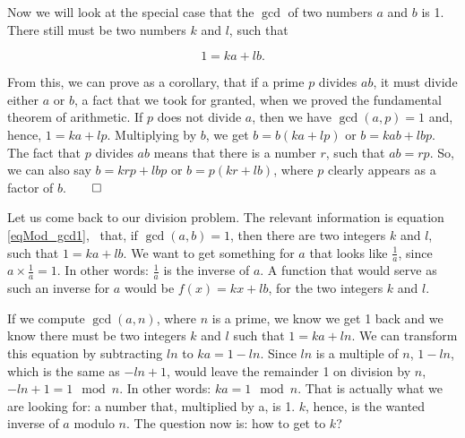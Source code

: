 \documentclass{scrreprt}
\begin{document}
Now we will look at the special case that the $\gcd$ 
of two numbers $a$ and $b$ is 1.
There still must be two numbers $k$ and $l$,
such that

\begin{equation}\label{eqMod_gcd1}
1 = ka + lb.
\end{equation}

From this, we can prove as a corollary,
that if a prime $p$ divides $ab$,
it must divide either $a$ or $b$,
a fact that we took for granted, when we proved
the fundamental theorem of arithmetic.
If $p$ does not divide $a$,
then we have $\gcd(a,p) = 1$ and, hence,
$1 = ka + lp$. 
Multiplying by $b$, we get $b = b(ka + lp)$ or
$b = kab + lbp$.
The fact that $p$ divides $ab$ means
that there is a number $r$, such that
$ab = rp$. So, we can also say $b = krp + lbp$ or
$b = p (kr + lb)$, where $p$ clearly appears as
a factor of $b$.$\qed$


Let us come back to our division problem.
The relevant information
is equation \ref{eqMod_gcd1}, \ie\ that,
if $\gcd(a,b) = 1$, then there are two integers
$k$ and $l$, such that $1 = ka + lb$.
We want to get something for $a$ that looks like
$\frac{1}{a}$, since $a \times \frac{1}{a} = 1$.
In other words: $\frac{1}{a}$ is the inverse of $a$.
A function that would serve as such an inverse for $a$
would be $f(x) = kx + lb$, for the two integers $k$ and $l$.

If we compute $\gcd(a,n)$, where $n$ is a prime,
we know we get 1 back and we know there must be
two integers $k$ and $l$ such that $1 = ka + ln$. 
We can transform this equation by subtracting $ln$ to $ka = 1 - ln$. 
Since $ln$ is a multiple of $n$, 
$1 - ln$, which is the same as $-ln + 1$, 
would leave the remainder 1 on division by $n$,
\ie\ $-ln + 1 = 1 \mod n$.
In other words: $ka = 1 \mod n$.
That is actually what we are looking for:
a number that, multiplied by a, is 1.
$k$, hence, is the wanted inverse of $a$ modulo $n$.
The question now is: how to get to $k$?
\end{document}

